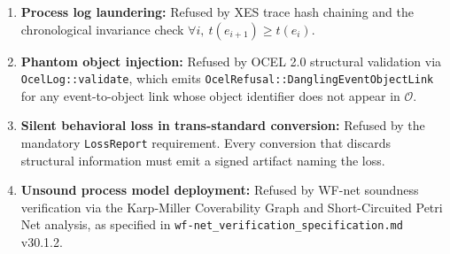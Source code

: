 \begin{enumerate}
  \item \textbf{Process log laundering:} Refused by XES trace hash chaining and the
        chronological invariance check $\forall i,\ t(e_{i+1}) \ge t(e_i)$.
  \item \textbf{Phantom object injection:} Refused by OCEL 2.0 structural validation
        via \texttt{OcelLog::validate}, which emits
        \texttt{OcelRefusal::DanglingEventObjectLink} for any event-to-object link whose
        object identifier does not appear in $\mathcal{O}$.
  \item \textbf{Silent behavioral loss in trans-standard conversion:} Refused by the
        mandatory \texttt{LossReport} requirement. Every conversion that discards
        structural information must emit a signed artifact naming the loss.
  \item \textbf{Unsound process model deployment:} Refused by WF-net soundness
        verification via the Karp-Miller Coverability Graph and Short-Circuited Petri Net
        analysis, as specified in \texttt{wf-net\_verification\_specification.md} v30.1.2.
\end{enumerate}

